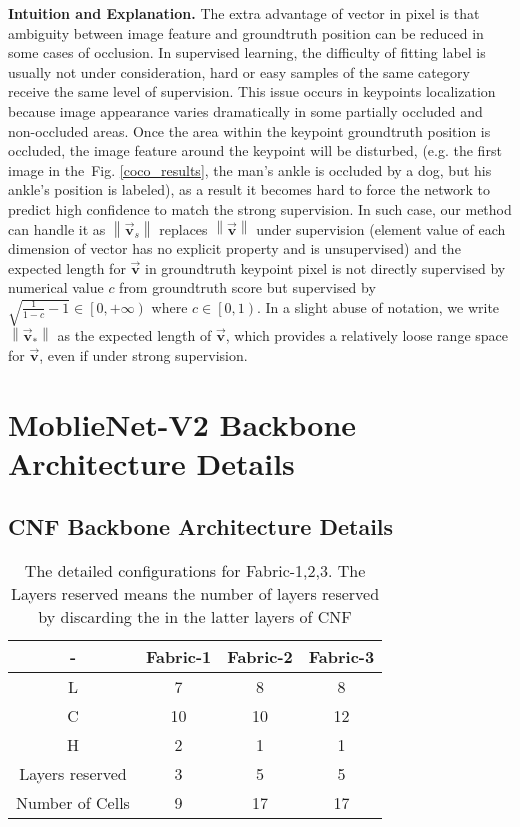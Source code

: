 \documentclass[journal]{IEEEtran}
\begin{document}
\textbf{Intuition and Explanation.} The extra advantage of vector in pixel is that ambiguity between image feature and groundtruth position can be reduced in some cases of occlusion. In supervised learning, the difficulty of fitting label is usually not under consideration, hard or easy samples of the same category receive the same level of supervision. This issue occurs in keypoints localization because image appearance varies dramatically in some partially occluded and non-occluded areas. Once the area within the keypoint groundtruth position is occluded, the image feature around the keypoint will be disturbed, (e.g. the first image in the~Fig. \ref{coco_results}, the man's ankle is occluded by a dog, but his ankle's position is labeled), as a result it becomes hard to force the network to predict high confidence to match the strong supervision. In such case, our method can handle it as $\left\|\vec{\mathbf{v}}_s\right\|$ replaces $\left\|\vec{\mathbf{v}}\right\|$ under supervision (element value of each dimension of vector has no explicit property and is unsupervised) and the expected length for $\vec{\mathbf{v}}$ in groundtruth keypoint pixel is not directly supervised by numerical value $c$ from groundtruth score but supervised by $\sqrt{\frac{1}{1-c}-1} \in\left[ 0,+\infty\right)$ where $ c\in\left[ 0,1\right) $. In a slight abuse of notation, we write $\left\| \vec{\mathbf{v}}_*\right\| $ as the expected length of $\vec{\mathbf{v}}$, which provides a relatively loose range space for $\vec{\mathbf{v}}$, even if under strong supervision.  

\section{MoblieNet-V2 Backbone Architecture Details}

\subsection{CNF Backbone Architecture Details}
\begin{table}[h]
	\renewcommand{\arraystretch}{1.3}
	\label{cnf_backbone}
	\caption{The detailed configurations for Fabric-1,2,3. The Layers reserved means the number of layers reserved by discarding the in the latter layers of CNF}
\centering

\begin{tabular}{c|c|c|c}
	\toprule[0.2em]
	
- &Fabric-1&Fabric-2&Fabric-3\\
\toprule[0.2em]
L&	7&8& 8\\
C& 10& 10&12\\
H& 2 & 1 & 1\\
Layers reserved& 3&5&5\\
Number of Cells  & 9 &17&17\\

	\toprule[0.2em]
\end{tabular}
\end{table}
	
\end{document}
